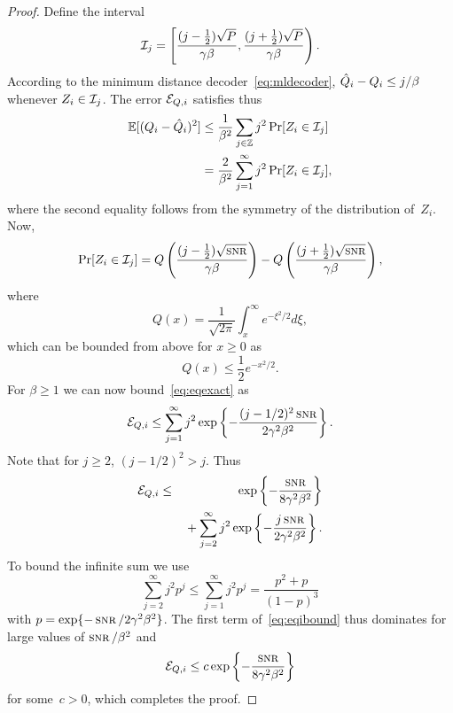 \begin{proof}
  Define the interval
  \begin{equation*}
    \mathcal{I}_j = \left[ \frac{(j - \frac12) \sqrt{P}}{\gamma\beta},
    \frac{(j + \frac12) \sqrt{P}}{\gamma\beta } \right).
  \end{equation*}
  According to the minimum distance decoder~\eqref{eq:mldecoder}, $\hat{Q}_i - Q_i
  \le j/\beta$ whenever $Z_i \in \mathcal{I}_j$.  The error ${{\mathcal{E}}_{Q,i}}$ satisfies thus
  \begin{align}
    \mathbb{E}[(Q_i - \hat{Q}_i)^2] &\le \frac{1}{\beta^2} \sum_{j \in \mathbb{Z}} j^2 \Pr[Z_i \in
    \mathcal{I}_j]  \nonumber \\
    &= \frac{2}{\beta^2} \sum_{j = 1}^\infty j^2 \Pr[Z_i \in \mathcal{I}_j],
    \label{eq:eqexact}
  \end{align}
  where the second equality follows from the symmetry of the distribution
  of~$Z_i$. Now,
  \begin{equation*}
    \Pr[Z_i \in \I_j] = Q\left( \frac{(j - \frac12) \sqrt{\snr}}{\gamma\beta}
    \right) - Q\left( \frac{(j + \frac12) \sqrt{\snr}}{\gamma\beta } \right),
  \end{equation*}
  where
  \begin{equation*}
    Q(x) = \frac{1}{\sqrt{2\pi}} \int_x^\infty e^{-\xi^2/2} d\xi,
  \end{equation*}
  which can be bounded from above for $x \ge 0$ as
  \begin{equation*}
    Q(x) \le \frac12 e^{-x^2/2}.
  \end{equation*}
  For $\beta \ge 1$ we can now bound~\eqref{eq:eqexact} as
  \begin{equation*}
    \Eqi \le \sum_{j=1}^\infty j^2 \exp\left\{ - \frac{(j - 1/2)^2
    \snr}{2\gamma^2\beta^2} \right\}.
  \end{equation*}
  Note that for $j \ge 2$, $(j - 1/2)^2 > j$.  Thus
  \begin{eqnarray}
    \Eqi &\le & \exp \left \{ - \frac{\snr}{8 \gamma^2 \beta^2} \right\}
    \nonumber \\
    & & \mbox{} + 
    \sum_{j = 2}^\infty j^2 \exp \left \{ - \frac{j \snr}{2\gamma^2 \beta^2}
    \right\}. \label{eq:eqibound}
  \end{eqnarray}
  To bound the infinite sum we use 
  \begin{equation}
    \label{eq:geomsum}
    \sum_{j=2}^\infty j^2 p^j \le \sum_{j=1}^\infty j^2 p^j = 
    \frac{p^2+p}{(1-p)^3}
  \end{equation}
  with $p = \exp\{-\snr/2 \gamma^2 \beta^2\}$. The first term
  of~\eqref{eq:eqibound} thus dominates for large values of
  $\snr/\beta^2$ and
  \begin{equation*}
    \Eqi \le c\exp\left\{ - \frac{\snr}{8 \gamma^2 \beta^2} \right\}
  \end{equation*}
  for some~$c > 0$, which completes the proof. 
\end{proof}

